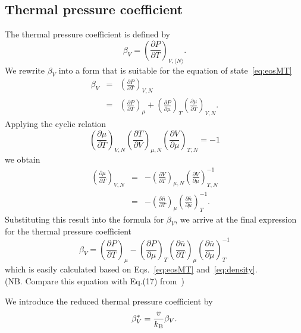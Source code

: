 \documentclass[12pt]{article}
\begin{document}
	\subsection{Thermal pressure coefficient}
	The thermal pressure coefficient is defined by
	\begin{equation}
		\label{def:therm_pres_coef}
		\beta_V = \left( \frac{\partial P}{\partial T} \right)_{V,\langle N \rangle}.
	\end{equation}
	We rewrite $\beta_V$ into a form that is suitable for the equation of state~\eqref{eq:eosMT}
	\begin{eqnarray}
		\beta_V & = & \left(\frac{\partial P}{\partial T}\right)_{V, N}
		\nonumber\\
		& = & \left(\frac{\partial P}{\partial T}\right)_{\mu} + \left(\frac{\partial P}{\partial \mu}\right)_T \left(\frac{\partial \mu}{\partial T}\right)_{V, N}.
	\end{eqnarray}
	Applying the cyclic relation
	\begin{equation*}
		\left(\frac{\partial \mu}{\partial T}\right)_{V, N} 
		\left(\frac{\partial T}{\partial V}\right)_{\mu, N}
		\left(\frac{\partial V}{\partial \mu}\right)_{T, N}
		= -1
	\end{equation*}
	we obtain
	\begin{eqnarray*}
		\left(\frac{\partial \mu}{\partial T}\right)_{V, N} 
		& = & 
		- \left(\frac{\partial V}{\partial T}\right)_{\mu, N} 
		\left(\frac{\partial V}{\partial \mu}\right)^{-1}_{T, N} \\
		& = & - \left(\frac{\partial \bar{n}}{\partial T}\right)_{\mu}
		\left(\frac{\partial \bar{n}}{\partial \mu}\right)^{-1}_{T}.		
	\end{eqnarray*}
	Substituting this result into the formula for $\beta_V$, we arrive at the final expression for the thermal pressure coefficient
	\begin{equation}
		\beta_V = \left(\frac{\partial P}{\partial T}\right)_{\mu} 
		- \left(\frac{\partial P}{\partial \mu}\right)_T 
		\left(\frac{\partial \bar{n}}{\partial T}\right)_{\mu}
		\left(\frac{\partial \bar{n}}{\partial \mu}\right)^{-1}_{T}
	\end{equation}
	which is easily calculated based on Eqs.~\eqref{eq:eosMT} and~\eqref{eq:density}.\\
	(NB. Compare this equation with Eq.(17) from~\cite{StrokerMeier2021})
	
	We introduce the reduced thermal pressure coefficient by
	\begin{equation}
		\beta^*_V = \frac{v}{k_{\rm B}}\beta_V.
	\end{equation}
	
\end{document}
